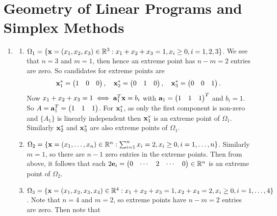 \section{Geometry of Linear Programs and Simplex Methods}
\begin{enumerate}
    \item \begin{enumerate}[label=(\alph*)]
              \item \(\Omega_1 = \{\mathbf{x} = (x_1, x_2, x_3) \in \mathbb{R}^3: x_1 + x_2 + x_3 = 1, x_i \geq 0, i = 1, 2, 3\}\). We see that \(n = 3\) and \(m = 1\), then hence an extreme point has \(n - m = 2\) entries are zero. So candidates for extreme points are
                    \[\mathbf{x}_1^* = \begin{pmatrix}
                            1 & 0 & 0
                        \end{pmatrix}, \quad \mathbf{x}_2^* = \begin{pmatrix}
                            0 & 1 & 0
                        \end{pmatrix}, \quad \mathbf{x}_3^* = \begin{pmatrix}
                            0 & 0 & 1
                        \end{pmatrix}.\]
                    Now \(x_1 + x_2 + x_3 = 1 \iff \mathbf{a}_1^T \mathbf{x} = b_i\) with \(\mathbf{a}_1 = \begin{pmatrix}
                        1 & 1 & 1
                    \end{pmatrix}^T\) and \(b_i = 1\). So \(A = \mathbf{a}_1^T = \begin{pmatrix}
                        1 & 1 & 1
                    \end{pmatrix}\). For \(\mathbf{x}_1^*\), as only the first component is non-zero and \(\{A_1\}\) is linearly independent then \(\mathbf{x}_1^*\) is an extreme point of \(\Omega_1\). Similarly \(\mathbf{x}_2^*\) and \(\mathbf{x}_3^*\) are also extreme points of \(\Omega_1\).
              \item \(\Omega_2 = \{\mathbf{x} = (x_1, \dots, x_n) \in \mathbb{R}^n : \sum_{i = 1}^n x_i = 2, x_i \geq 0, i = 1, \dots, n \}\). Similarly \(m = 1\), so there are \(n - 1\) zero entries in the extreme points. Then from above, it follows that each \(2\mathbf{e}_i = \begin{pmatrix}
                        0 & \cdots & 2 & \cdots & 0
                    \end{pmatrix} \in \mathbb{R}^n\) is an extreme point of \(\Omega_2\).
              \item \(\Omega_3 = \{\mathbf{x} = (x_1, x_2, x_3, x_4) \in \mathbb{R}^4 : x_1 + x_2 + x_3 = 1, x_2 + x_4 = 2, x_i \geq 0, i = 1, \dots, 4\}\). Note that \(n = 4\) and \(m = 2\), so extreme points have \(n - m = 2\) entries are zero. Then note that

\end{enumerate}
\end{enumerate}
